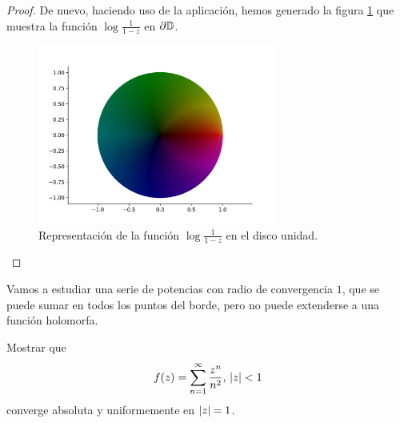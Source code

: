 \begin{proof}
    De nuevo, haciendo uso de la aplicación, hemos generado la figura  \ref{fig:ejemplo2} que muestra la función $\log{\frac{1}{1 - z}}$ en $\partial \mathbb{D}$. \\

\begin{figure}[h]
    \centering
    \includegraphics[width=0.7\textwidth]{../Aplicacion/log(1:(1-z)).png}
    \caption{Representación de la función $\log{\frac{1}{1 - z}}$ en el disco unidad.}
    \label{fig:ejemplo2}
\end{figure}



\end{proof}


Vamos a estudiar una serie de potencias con radio de convergencia $1$, que se puede sumar en todos los puntos del borde, pero no puede extenderse a una función holomorfa. \\

\begin{example}
    Mostrar que
    \begin{equation*}
        f(z) = \sum_{n=1}^{\infty} \frac{z^n}{n^2}, \, \left\lvert z\right\rvert < 1
    \end{equation*}
    converge absoluta y uniformemente en $\left\lvert z\right\rvert = 1$.
\end{example}

